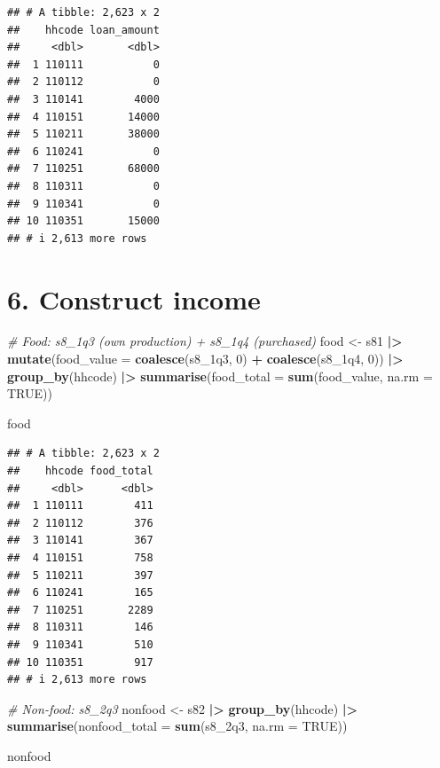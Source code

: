 \documentclass[
]{article}
\newenvironment{Shaded}{\begin{snugshade}}{\end{snugshade}}
\newcommand{\AttributeTok}[1]{\textcolor[rgb]{0.13,0.29,0.53}{#1}}
\newcommand{\CommentTok}[1]{\textcolor[rgb]{0.56,0.35,0.01}{\textit{#1}}}
\newcommand{\ConstantTok}[1]{\textcolor[rgb]{0.56,0.35,0.01}{#1}}
\newcommand{\DecValTok}[1]{\textcolor[rgb]{0.00,0.00,0.81}{#1}}
\newcommand{\FunctionTok}[1]{\textcolor[rgb]{0.13,0.29,0.53}{\textbf{#1}}}
\newcommand{\NormalTok}[1]{#1}
\newcommand{\OtherTok}[1]{\textcolor[rgb]{0.56,0.35,0.01}{#1}}
\newcommand{\SpecialCharTok}[1]{\textcolor[rgb]{0.81,0.36,0.00}{\textbf{#1}}}
\begin{document}
\begin{verbatim}
## # A tibble: 2,623 x 2
##    hhcode loan_amount
##     <dbl>       <dbl>
##  1 110111           0
##  2 110112           0
##  3 110141        4000
##  4 110151       14000
##  5 110211       38000
##  6 110241           0
##  7 110251       68000
##  8 110311           0
##  9 110341           0
## 10 110351       15000
## # i 2,613 more rows
\end{verbatim}

\section{6. Construct income}\label{construct-income}

\begin{Shaded}
\begin{Highlighting}[]
\CommentTok{\# Food: s8\_1q3 (own production) + s8\_1q4 (purchased)}
\NormalTok{food }\OtherTok{\textless{}{-}}\NormalTok{ s81 }\SpecialCharTok{|\textgreater{}}
  \FunctionTok{mutate}\NormalTok{(}\AttributeTok{food\_value =} \FunctionTok{coalesce}\NormalTok{(s8\_1q3, }\DecValTok{0}\NormalTok{) }\SpecialCharTok{+} \FunctionTok{coalesce}\NormalTok{(s8\_1q4, }\DecValTok{0}\NormalTok{)) }\SpecialCharTok{|\textgreater{}}
  \FunctionTok{group\_by}\NormalTok{(hhcode) }\SpecialCharTok{|\textgreater{}}
  \FunctionTok{summarise}\NormalTok{(}\AttributeTok{food\_total =} \FunctionTok{sum}\NormalTok{(food\_value, }\AttributeTok{na.rm =} \ConstantTok{TRUE}\NormalTok{))}

\NormalTok{food}
\end{Highlighting}
\end{Shaded}

\begin{verbatim}
## # A tibble: 2,623 x 2
##    hhcode food_total
##     <dbl>      <dbl>
##  1 110111        411
##  2 110112        376
##  3 110141        367
##  4 110151        758
##  5 110211        397
##  6 110241        165
##  7 110251       2289
##  8 110311        146
##  9 110341        510
## 10 110351        917
## # i 2,613 more rows
\end{verbatim}

\begin{Shaded}
\begin{Highlighting}[]
\CommentTok{\# Non{-}food: s8\_2q3}
\NormalTok{nonfood }\OtherTok{\textless{}{-}}\NormalTok{ s82 }\SpecialCharTok{|\textgreater{}}
  \FunctionTok{group\_by}\NormalTok{(hhcode) }\SpecialCharTok{|\textgreater{}}
  \FunctionTok{summarise}\NormalTok{(}\AttributeTok{nonfood\_total =} \FunctionTok{sum}\NormalTok{(s8\_2q3, }\AttributeTok{na.rm =} \ConstantTok{TRUE}\NormalTok{))}

\NormalTok{nonfood}
\end{Highlighting}
\end{Shaded}
\end{document}
